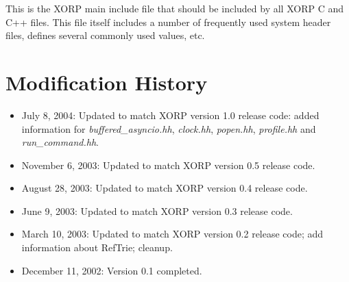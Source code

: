 \documentclass[11pt]{article}
\begin{document}
This is the XORP main include file that should be included by all XORP
C and C++ files. This file itself includes a number of frequently used system
header files, defines several commonly used values, etc.


\appendix
\section{Modification History}

\begin{itemize}

  \item July 8, 2004: Updated to match XORP version 1.0 release code:
   added information for \emph{buffered\_asyncio.hh}, \emph{clock.hh},
   \emph{popen.hh}, \emph{profile.hh} and \emph{run\_command.hh}.

  \item November 6, 2003: Updated to match XORP version 0.5 release code.

  \item August 28, 2003: Updated to match XORP version 0.4 release
  code.

  \item June 9, 2003: Updated to match XORP version 0.3 release code.

  \item March 10, 2003: Updated to match XORP version 0.2 release code;
  add information about RefTrie; cleanup.

  \item December 11, 2002: Version 0.1 completed.

\end{itemize}




\end{document}
